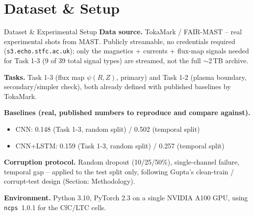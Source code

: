 \documentclass[aspectratio=169]{beamer}
\begin{document}
\section{Dataset \& Setup}
\begin{frame}{Dataset \& Experimental Setup}
  \small
  \textbf{Data source.} TokaMark / FAIR-MAST -- real experimental shots from
  MAST. Publicly streamable, no credentials required
  (\texttt{s3.echo.stfc.ac.uk}); only the magnetics + currents + flux-map
  signals needed for Task 1-3 (9 of 39 total signal types) are streamed, not
  the full $\sim$2\,TB archive.

  \vspace{4pt}
  \textbf{Tasks.} Task 1-3 (flux map $\psi(R,Z)$, primary) and Task 1-2
  (plasma boundary, secondary/simpler check), both already defined with
  published baselines by TokaMark.

  \vspace{4pt}
  \textbf{Baselines (real, published numbers to reproduce and compare against).}
  \begin{itemize}
    \setlength\itemsep{1pt}
    \item CNN: 0.148 (Task 1-3, random split) / 0.502 (temporal split)
    \item CNN+LSTM: 0.159 (Task 1-3, random split) / 0.257 (temporal split)
  \end{itemize}

  \vspace{4pt}
  \textbf{Corruption protocol.} Random dropout (10/25/50\%), single-channel
  failure, temporal gap -- applied to the test split only, following
  Gupta's clean-train / corrupt-test design (Section: Methodology).

  \vspace{2pt}
  \textbf{Environment.} Python 3.10, PyTorch 2.3 on a single NVIDIA A100 GPU,
using \texttt{ncps}~1.0.1 for the CfC/LTC cells.
\end{frame}

\end{document}
